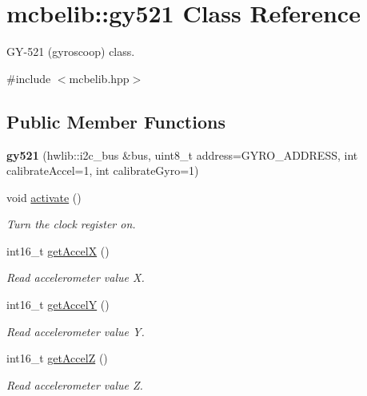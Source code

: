 \hypertarget{classmcbelib_1_1gy521}{}\section{mcbelib\+:\+:gy521 Class Reference}
\label{classmcbelib_1_1gy521}


G\+Y-\/521 (gyroscoop) class.  




{\ttfamily \#include $<$mcbelib.\+hpp$>$}

\subsection*{Public Member Functions}
\begin{DoxyCompactItemize}
\item 
\mbox{\label{classmcbelib_1_1gy521_a326ed53b38fcbf3d9e87a5f722bf1d57}} 
{\bfseries gy521} (hwlib\+::i2c\+\_\+bus \&bus, uint8\+\_\+t address=G\+Y\+R\+O\+\_\+\+A\+D\+D\+R\+E\+SS, int calibrate\+Accel=1, int calibrate\+Gyro=1)
\item 
void \hyperlink{classmcbelib_1_1gy521_a3d894d6a553ab6ed660886c349f2f7bf}{activate} ()
\begin{DoxyCompactList}\small\item\em Turn the clock register on. \end{DoxyCompactList}\item 
int16\+\_\+t \hyperlink{classmcbelib_1_1gy521_a65218b1467163b223d091ab309133b8c}{get\+AccelX} ()
\begin{DoxyCompactList}\small\item\em Read accelerometer value X. \end{DoxyCompactList}\item 
int16\+\_\+t \hyperlink{classmcbelib_1_1gy521_a57711c636f4541aa442cac6fd9539666}{get\+AccelY} ()
\begin{DoxyCompactList}\small\item\em Read accelerometer value Y. \end{DoxyCompactList}\item 
int16\+\_\+t \hyperlink{classmcbelib_1_1gy521_ad4b00d9882416e17a518b121c3f46b11}{get\+AccelZ} ()
\begin{DoxyCompactList}\small\item\em Read accelerometer value Z. \end{DoxyCompactList}\item 

\end{DoxyCompactItemize}
